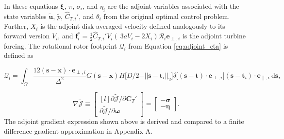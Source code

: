 \documentclass[energies,article,submit,moreauthors,latex,10pt,a4paper]{mdpi}
\newcommand{\ds}{~\text{d}\boldsymbol{s}}
\newcommand{\bs}[1]{\boldsymbol{#1}}
\newcommand{\sint}{\int_{\Omega}}
\newcommand{\utilde}{\widetilde{\bs{u}}}
\newcommand{\ptilde}{\widetilde{p}}
\newcommand{\ctihat}{\widehat{C}_{T,i}'}
\newcommand{\R}{\mathscr{R}}
\newcommand{\Jtilde}{\tilde{\mathscr{J}}}
\newcommand{\eperpi}{\bs{e}_{\perp,i}}
\newcommand{\etransi}{\bs{e}_{\parallel,i}}
\newcommand{\diracdelta}{{\delta}}
\begin{document}
\noindent In these equations $\bs{\xi}$, $\pi$, $\sigma_i$, and $\eta_i$ are the adjoint variables associated with the state variables $\utilde$, $\ptilde$, $\ctihat$, and $\theta_i$ from the original optimal control problem. Further, $X_i$ is the adjoint disk-averaged velocity defined analogously to its forward version $V_i$, and $\bs{f}_i^* = \frac{1}{2} \ctihat V_i (~3a V_i - 2 X_i ) \R_i \eperpi$ is the adjoint turbine forcing. The rotational rotor footprint $\mathscr{Q}_i$ from Equation \eqref{eq:adjoint_eta} is defined as 

\begin{equation}
\mathscr{Q}_i = \sint \frac{12 (\bs{s} - \bs{x})\cdot \eperpi}{\Delta^2} G(\bs{s} - \bs{x})  H\big[D/2 - \vert\vert \bs{s} - \bs{t}_i \vert\vert_2 \big] \diracdelta\big[(\bs{s} - \bs{t})\cdot \eperpi \big]  (\bs{s} - \bs{t}_i) \cdot \etransi \ds,
\end{equation} 


\begin{equation}
\nabla \Jtilde \equiv 
\begin{bmatrix*}[l]
\partial \Jtilde / \partial \bs{C}_T' \\
\partial \Jtilde / \partial \bs{\omega} 
\end{bmatrix*} = 
\begin{bmatrix}
- \bs{\sigma}\\
- \bs{\eta}
\end{bmatrix} \label{eq:problem_gradient}.
\end{equation}
The adjoint gradient expression shown above is derived and compared to a finite difference gradient approximation in Appendix A.
\end{document}
